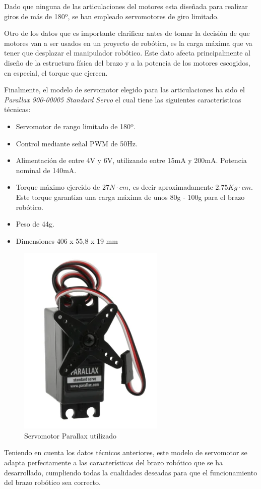Dado que ninguna de las articulaciones del motores esta diseñada para realizar giros de más de 180º, se han empleado servomotores de giro limitado.

Otro de los datos que es importante clarificar antes de tomar la decisión de que motores van a ser usados en un proyecto de robótica, es la carga máxima que va tener que desplazar el manipulador robótico. Este dato afecta principalmente al diseño de la estructura física del brazo y a la potencia de los motores escogidos, en especial, el torque que ejercen. 

Finalmente, el modelo de servomotor elegido para las articulaciones ha sido el \textit{Parallax 900-00005 Standard Servo} el cual tiene las siguientes características técnicas:

\begin{itemize}
    \item Servomotor de rango limitado de 180º.
    \item Control mediante señal PWM de 50Hz.
    \item Alimentación de entre 4V y 6V, utilizando entre 15mA y 200mA. Potencia nominal de 140mA.
    \item Torque máximo ejercido de $27N\cdot cm$, es decir aproximadamente $2.75 Kg\cdot cm$. Este torque garantiza una carga máxima de unos 80g - 100g para el brazo robótico.
    \item Peso de 44g.
    \item Dimensiones 406 x 55,8 x 19 mm
\end{itemize}

\begin{figure}[H]
    \centering 
    \includegraphics[width=.35\linewidth]{pictures/ServoParallax.PNG}
    \caption{Servomotor Parallax utilizado}
    \label{fig:}
\end{figure}

Teniendo en cuenta los datos técnicos anteriores, este modelo de servomotor se adapta perfectamente a las características del brazo robótico que se ha desarrollado, cumpliendo todas la cualidades deseadas para que el funcionamiento del brazo robótico sea correcto.